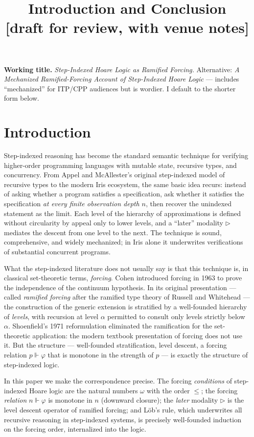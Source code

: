 \documentclass[11pt]{article}
\title{Introduction and Conclusion \\
       \large{[draft for review, with venue notes]}}
\author{}
\date{}
\begin{document}
\maketitle

\noindent\textbf{Working title.}
\emph{Step-Indexed Hoare Logic as Ramified Forcing.}
Alternative: \emph{A Mechanized Ramified-Forcing Account of Step-Indexed Hoare Logic} --- includes ``mechanized'' for ITP/CPP audiences but is wordier. I default to the shorter form below.

\section{Introduction}

Step-indexed reasoning has become the standard semantic technique
for verifying higher-order programming languages with mutable state,
recursive types, and concurrency. From Appel and McAllester's
original step-indexed model of recursive types to the modern Iris
ecosystem, the same basic idea recurs: instead of asking whether a
program satisfies a specification, ask whether it satisfies the
specification \emph{at every finite observation depth $n$}, then
recover the unindexed statement as the limit. Each level of the
hierarchy of approximations is defined without circularity by appeal
only to lower levels, and a ``later'' modality $\triangleright$
mediates the descent from one level to the next. The technique is
sound, comprehensive, and widely mechanized; in Iris alone it
underwrites verifications of substantial concurrent programs.

What the step-indexed literature does not usually say is that this
technique is, in classical set-theoretic terms, \emph{forcing}.
Cohen introduced forcing in 1963 to prove the independence of the
continuum hypothesis. In its original presentation --- called
\emph{ramified forcing} after the ramified type theory of Russell
and Whitehead --- the construction of the generic extension is
stratified by a well-founded hierarchy of \emph{levels}, with
recursion at level $\alpha$ permitted to consult only levels strictly
below $\alpha$. Shoenfield's 1971 reformulation eliminated the
ramification for the set-theoretic application: the modern textbook
presentation of forcing does not use it. But the structure ---
well-founded stratification, level descent, a forcing relation
$p \Vdash \varphi$ that is monotone in the strength of $p$ --- is
exactly the structure of step-indexed logic.

In this paper we make the correspondence precise. The forcing
\emph{conditions} of step-indexed Hoare logic are the natural numbers
$\omega$ with the order $\le$; the forcing \emph{relation}
$n \Vdash \varphi$ is monotone in $n$ (downward closure); the
\emph{later} modality $\triangleright$ is the level descent operator
of ramified forcing; and Löb's rule, which underwrites all
recursive reasoning in step-indexed systems, is precisely
well-founded induction on the forcing order, internalized into the
logic.
\end{document}
